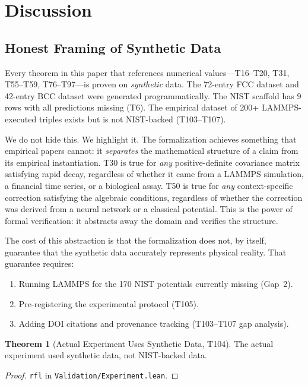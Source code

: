 \documentclass[11pt,a4paper]{article}
\theoremstyle{definition}
\newtheorem{theorem}{Theorem}[section]
\theoremstyle{plain}
\begin{document}
\section{Discussion}
\label{sec:discussion}

\subsection{Honest Framing of Synthetic Data}
\label{subsec:honest}

Every theorem in this paper that references numerical values---T16--T20, T31, T55--T59, T76--T97---is proven on \emph{synthetic} data. The 72-entry FCC dataset and 42-entry BCC dataset were generated programmatically. The NIST scaffold has 9 rows with all predictions missing (T6). The empirical dataset of 200+ LAMMPS-executed triples exists but is not NIST-backed (T103--T107).

We do not hide this. We highlight it. The formalization achieves something that empirical papers cannot: it \emph{separates} the mathematical structure of a claim from its empirical instantiation. T30 is true for \emph{any} positive-definite covariance matrix satisfying rapid decay, regardless of whether it came from a LAMMPS simulation, a financial time series, or a biological assay. T50 is true for \emph{any} context-specific correction satisfying the algebraic conditions, regardless of whether the correction was derived from a neural network or a classical potential. This is the power of formal verification: it abstracts away the domain and verifies the structure.

The cost of this abstraction is that the formalization does not, by itself, guarantee that the synthetic data accurately represents physical reality. That guarantee requires:
\begin{enumerate}
\item Running LAMMPS for the 170 NIST potentials currently missing (Gap~2).
\item Pre-registering the experimental protocol (T105).
\item Adding DOI citations and provenance tracking (T103--T107 gap analysis).
\end{enumerate}

\begin{theorem}[Actual Experiment Uses Synthetic Data, T104]
\label{thm:synthetic}
The actual experiment used synthetic data, not NIST-backed data.
\end{theorem}
\begin{proof}
\texttt{rfl} in \texttt{Validation/Experiment.lean}.
\end{proof}
\end{document}
